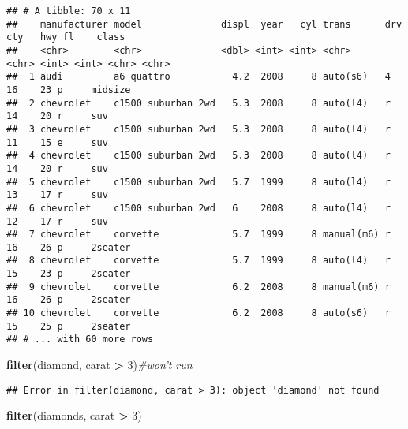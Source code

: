 \documentclass[
]{book}
\newenvironment{Shaded}{\begin{snugshade}}{\end{snugshade}}
\newcommand{\CommentTok}[1]{\textcolor[rgb]{0.56,0.35,0.01}{\textit{#1}}}
\newcommand{\DecValTok}[1]{\textcolor[rgb]{0.00,0.00,0.81}{#1}}
\newcommand{\KeywordTok}[1]{\textcolor[rgb]{0.13,0.29,0.53}{\textbf{#1}}}
\newcommand{\NormalTok}[1]{#1}
\newcommand{\OperatorTok}[1]{\textcolor[rgb]{0.81,0.36,0.00}{\textbf{#1}}}
\newcommand{\StringTok}[1]{\textcolor[rgb]{0.31,0.60,0.02}{#1}}
\begin{document}
\begin{verbatim}
## # A tibble: 70 x 11
##    manufacturer model              displ  year   cyl trans      drv     cty   hwy fl    class  
##    <chr>        <chr>              <dbl> <int> <int> <chr>      <chr> <int> <int> <chr> <chr>  
##  1 audi         a6 quattro           4.2  2008     8 auto(s6)   4        16    23 p     midsize
##  2 chevrolet    c1500 suburban 2wd   5.3  2008     8 auto(l4)   r        14    20 r     suv    
##  3 chevrolet    c1500 suburban 2wd   5.3  2008     8 auto(l4)   r        11    15 e     suv    
##  4 chevrolet    c1500 suburban 2wd   5.3  2008     8 auto(l4)   r        14    20 r     suv    
##  5 chevrolet    c1500 suburban 2wd   5.7  1999     8 auto(l4)   r        13    17 r     suv    
##  6 chevrolet    c1500 suburban 2wd   6    2008     8 auto(l4)   r        12    17 r     suv    
##  7 chevrolet    corvette             5.7  1999     8 manual(m6) r        16    26 p     2seater
##  8 chevrolet    corvette             5.7  1999     8 auto(l4)   r        15    23 p     2seater
##  9 chevrolet    corvette             6.2  2008     8 manual(m6) r        16    26 p     2seater
## 10 chevrolet    corvette             6.2  2008     8 auto(s6)   r        15    25 p     2seater
## # ... with 60 more rows
\end{verbatim}

\begin{Shaded}
\begin{Highlighting}[]
\KeywordTok{filter}\NormalTok{(diamond, carat }\OperatorTok{>}\StringTok{ }\DecValTok{3}\NormalTok{)}\CommentTok{#won't run}
\end{Highlighting}
\end{Shaded}

\begin{verbatim}
## Error in filter(diamond, carat > 3): object 'diamond' not found
\end{verbatim}

\begin{Shaded}
\begin{Highlighting}[]
\KeywordTok{filter}\NormalTok{(diamonds, carat }\OperatorTok{>}\StringTok{ }\DecValTok{3}\NormalTok{)}
\end{Highlighting}
\end{Shaded}
\end{document}
